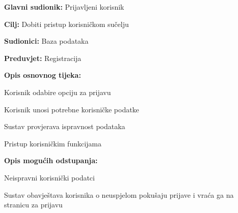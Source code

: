 						\noindent {}
					\begin{packed_item}
	
						\item \textbf{Glavni sudionik: }Prijavljeni korisnik
						\item  \textbf{Cilj: }Dobiti pristup korisničkom sučelju
						\item  \textbf{Sudionici: }Baza podataka
						\item  \textbf{Preduvjet: }Registracija
						\item  \textbf{Opis osnovnog tijeka:}
						
						\item[] \begin{packed_enum}
	
							\item Korisnik odabire opciju za prijavu
							\item Korisnik unosi potrebne korisničke podatke
							\item Sustav provjerava ispravnost podataka
							\item Pristup korisničkim funkcijama

						\end{packed_enum}
						
						\item  \textbf{Opis mogućih odstupanja:}
						
						\item[] \begin{packed_item}
	
							\item[2.a] Neispravni korisnički podatci
							\item[] \begin{packed_enum}
								
								\item Sustav obavještava korisnika o neuspjelom pokušaju prijave i vraća ga na stranicu za prijavu
								
							\end{packed_enum}
							
						\end{packed_item}						
					\end{packed_item}			
					



